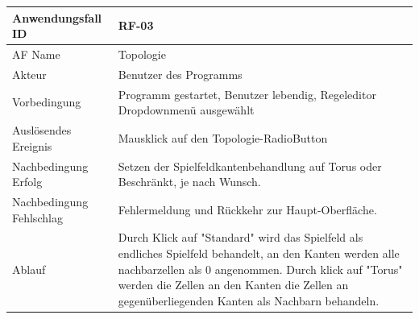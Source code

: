 \documentclass[11pt,a4paper]{article}
\begin{document}
	\begin{tabular}[m]{|m{7cm}|m{9cm}|}
		\hline
		Anwendungsfall ID     & RF-03 \\ %
		\hline
		AF Name     &  Topologie \\
		\hline
		Akteur&Benutzer des Programms \\
		\hline
		Vorbedingung&Programm gestartet, Benutzer lebendig, Regeleditor Dropdownmenü ausgewählt\\
		\hline
		Auslösendes Ereignis&Mausklick auf den Topologie-RadioButton\\
		\hline
		Nachbedingung Erfolg&Setzen der Spielfeldkantenbehandlung auf Torus oder Beschränkt, je nach Wunsch.\\
		\hline
		Nachbedingung Fehlschlag&Fehlermeldung und Rückkehr zur Haupt-Oberfläche.\\
		\hline
		Ablauf&Durch Klick auf "Standard" wird das Spielfeld als endliches Spielfeld behandelt, an den Kanten werden alle nachbarzellen als 0 angenommen.
		Durch klick auf "Torus" werden die Zellen an den Kanten die Zellen an gegenüberliegenden Kanten als Nachbarn behandeln.\\
		\hline
	\end{tabular}
	
\end{document}
